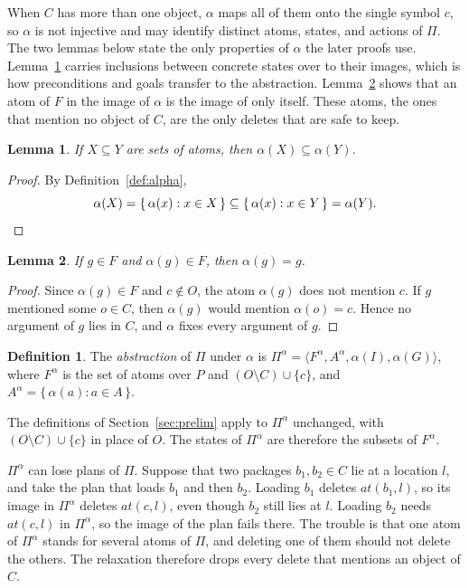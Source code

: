 \documentclass{article}
\theoremstyle{definition}
\newtheorem{definition}{Definition}
\theoremstyle{plain}
\newtheorem{lemma}{Lemma}
\theoremstyle{definition}
\begin{document}
When $C$ has more than one object, $\alpha$ maps all of them onto the single symbol $c$, so $\alpha$ is not injective and may identify distinct atoms, states, and actions of $\Pi$. The two lemmas below state the only properties of $\alpha$ the later proofs use. Lemma~\ref{lem:image} carries inclusions between concrete states over to their images, which is how preconditions and goals transfer to the abstraction. Lemma~\ref{lem:fixed} shows that an atom of $F$ in the image of $\alpha$ is the image of only itself. These atoms, the ones that mention no object of $C$, are the only deletes that are safe to keep.

\begin{lemma}\label{lem:image}
If $X \subseteq Y$ are sets of atoms, then $\alpha(X) \subseteq \alpha(Y)$.
\end{lemma}

\begin{proof}
By Definition~\ref{def:alpha},
\[
  \alpha(X) = \{\, \alpha(x) : x \in X \,\} \subseteq \{\, \alpha(x) : x \in Y \,\} = \alpha(Y). \qedhere
\]
\end{proof}

\begin{lemma}\label{lem:fixed}
If $g \in F$ and $\alpha(g) \in F$, then $\alpha(g) = g$.
\end{lemma}

\begin{proof}
Since $\alpha(g) \in F$ and $c \notin O$, the atom $\alpha(g)$ does not mention $c$. If $g$ mentioned some $o \in C$, then $\alpha(g)$ would mention $\alpha(o) = c$. Hence no argument of $g$ lies in $C$, and $\alpha$ fixes every argument of $g$.
\end{proof}

\begin{definition}
The \emph{abstraction} of $\Pi$ under $\alpha$ is $\Pi^\alpha = \langle F^\alpha, A^\alpha, \alpha(I), \alpha(G)\rangle$, where $F^\alpha$ is the set of atoms over $P$ and $(O \setminus C) \cup \{c\}$, and $A^\alpha = \{\, \alpha(a) : a \in A \,\}$.
\end{definition}

The definitions of Section~\ref{sec:prelim} apply to $\Pi^\alpha$ unchanged, with $(O \setminus C) \cup \{c\}$ in place of $O$. The states of $\Pi^\alpha$ are therefore the subsets of $F^\alpha$.

$\Pi^\alpha$ can lose plans of $\Pi$. Suppose that two packages $b_1, b_2 \in C$ lie at a location $l$, and take the plan that loads $b_1$ and then $b_2$. Loading $b_1$ deletes $\mathit{at}(b_1, l)$, so its image in $\Pi^\alpha$ deletes $\mathit{at}(c, l)$, even though $b_2$ still lies at $l$. Loading $b_2$ needs $\mathit{at}(c, l)$ in $\Pi^\alpha$, so the image of the plan fails there. The trouble is that one atom of $\Pi^\alpha$ stands for several atoms of $\Pi$, and deleting one of them should not delete the others. The relaxation therefore drops every delete that mentions an object of $C$.
\end{document}
